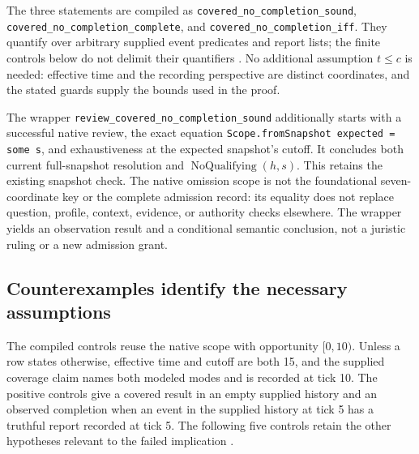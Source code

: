 \documentclass[11pt]{article}
\newcommand{\op}[1]{\operatorname{#1}}
\begin{document}
The three statements are compiled as \texttt{covered\_\allowbreak{}no\_\allowbreak{}completion\_\allowbreak{}sound}, \texttt{covered\_\allowbreak{}no\_\allowbreak{}completion\_\allowbreak{}complete}, and \texttt{covered\_\allowbreak{}no\_\allowbreak{}completion\_\allowbreak{}iff}. They quantify over arbitrary supplied event predicates and report lists; the finite controls below do not delimit their quantifiers \cite{omission-semantics}. No additional assumption \(t\le c\) is needed: effective time and the recording perspective are distinct coordinates, and the stated guards supply the bounds used in the proof.

The wrapper \texttt{review\_\allowbreak{}covered\_\allowbreak{}no\_\allowbreak{}completion\_\allowbreak{}sound} additionally starts with a successful native review, the exact equation \texttt{Scope.\allowbreak{}fromSnapshot expected = some s}, and exhaustiveness at the expected snapshot's cutoff. It concludes both current full-snapshot resolution and \(\op{NoQualifying}(h,s)\). This retains the existing snapshot check. The native omission scope is not the foundational seven-coordinate key or the complete admission record: its equality does not replace question, profile, context, evidence, or authority checks elsewhere. The wrapper yields an observation result and a conditional semantic conclusion, not a juristic ruling or a new admission grant.

\subsection{Counterexamples identify the necessary assumptions}

The compiled controls reuse the native scope with opportunity \([0,10)\). Unless a row states otherwise, effective time and cutoff are both 15, and the supplied coverage claim names both modeled modes and is recorded at tick 10. The positive controls give a covered result in an empty supplied history and an observed completion when an event in the supplied history at tick 5 has a truthful report recorded at tick 5. The following five controls retain the other hypotheses relevant to the failed implication \cite{omission-semantics}.
\end{document}
